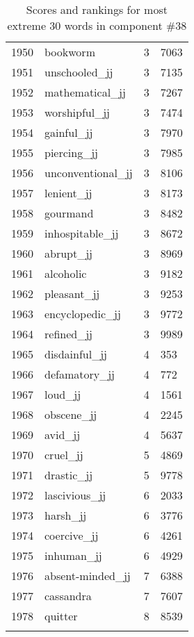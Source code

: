 \begin{longtable}[!htbp]{| rlr@{.}l |}
    1950 & bookworm & 3 & 7063 \\
    1951 & unschooled\_jj & 3 & 7135 \\
    1952 & mathematical\_jj & 3 & 7267 \\
    1953 & worshipful\_jj & 3 & 7474 \\
    1954 & gainful\_jj & 3 & 7970 \\
    1955 & piercing\_jj & 3 & 7985 \\
    1956 & unconventional\_jj & 3 & 8106 \\
    1957 & lenient\_jj & 3 & 8173 \\
    1958 & gourmand & 3 & 8482 \\
    1959 & inhospitable\_jj & 3 & 8672 \\
    1960 & abrupt\_jj & 3 & 8969 \\
    1961 & alcoholic & 3 & 9182 \\
    1962 & pleasant\_jj & 3 & 9253 \\
    1963 & encyclopedic\_jj & 3 & 9772 \\
    1964 & refined\_jj & 3 & 9989 \\
    1965 & disdainful\_jj & 4 & 353 \\
    1966 & defamatory\_jj & 4 & 772 \\
    1967 & loud\_jj & 4 & 1561 \\
    1968 & obscene\_jj & 4 & 2245 \\
    1969 & avid\_jj & 4 & 5637 \\
    1970 & cruel\_jj & 5 & 4869 \\
    1971 & drastic\_jj & 5 & 9778 \\
    1972 & lascivious\_jj & 6 & 2033 \\
    1973 & harsh\_jj & 6 & 3776 \\
    1974 & coercive\_jj & 6 & 4261 \\
    1975 & inhuman\_jj & 6 & 4929 \\
    1976 & absent-minded\_jj & 7 & 6388 \\
    1977 & cassandra & 7 & 7607 \\
    1978 & quitter & 8 & 8539 \\
    \hline
    \caption{Scores and rankings for most extreme 30 words in component \#38} \\
\end{longtable}
